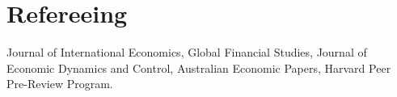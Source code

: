 \documentclass[letterpaper,11pt]{article}
\makeatletter
\newcommand{\resumeSubheading}[4]{
  \vspace{-1pt}\item
    \begin{tabular*}{0.97\textwidth}{l@{\extracolsep{\fill}}r}
      \textbf{#1} & #2 \\
      \textit{\small#3} & \textit{\small #4} \\
    \end{tabular*}\vspace{-5pt}
}
\newcommand{\resumeSubHeadingListStart}{\begin{itemize}[leftmargin=*]}
\newcommand{\resumeSubHeadingListEnd}{\end{itemize}}
\makeatother
\begin{document}
%
      

      
      
      
      
      
      
      
      
      
      
      


\section{Refereeing}
\begin{description}[font=$\bullet$]
\item {Journal of International Economics, Global Financial Studies, Journal of Economic Dynamics and Control, Australian Economic Papers, Harvard Peer Pre-Review Program.} 
\end{description}

\end{document}

